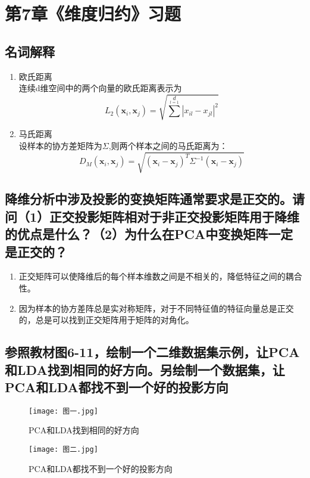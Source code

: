 \documentclass{ctexart}
\begin{document}
\section*{第7章《维度归约》习题}
\subsection*{名词解释}
\begin{enumerate}[(1)]
\item 欧氏距离\\
连续d维空间中的两个向量的欧氏距离表示为
\begin{equation*}
L_2(\bm{x}_i,\bm{x}_j)=\sqrt{\sum\limits^d\limits_{l=1}|x_{il}-x_{jl}|^2}
\end{equation*}
\item 马氏距离\\
设样本的协方差矩阵为$\Sigma$,则两个样本之间的马氏距离为：
\begin{equation*}
D_M(\bm{x}_i,\bm{x}_j)=\sqrt{(\bm{x}_i-\bm{x}_j)^T\Sigma^{-1}(\bm{x}_i-\bm{x}_j)}
\end{equation*}
\end{enumerate}


\subsection*{降维分析中涉及投影的变换矩阵通常要求是正交的。请问（1）正交投影矩阵相对于非正交投影矩阵用于降维的优点是什么？（2）为什么在PCA中变换矩阵一定是正交的？}
\begin{enumerate}[(1)]
\item 正交矩阵可以使降维后的每个样本维数之间是不相关的，降低特征之间的耦合性。
\item 因为样本的协方差阵总是实对称矩阵，对于不同特征值的特征向量总是正交的，总是可以找到正交矩阵用于矩阵的对角化。
\end{enumerate}

\subsection*{参照教材图6-11，绘制一个二维数据集示例，让PCA和LDA找到相同的好方向。另绘制一个数据集，让PCA和LDA都找不到一个好的投影方向}

\begin{figure}[H]
\texttt{[image: 图一.jpg]}
\caption{PCA和LDA找到相同的好方向}
\end{figure}

\begin{figure}[H]
\texttt{[image: 图二.jpg]}
\caption{PCA和LDA都找不到一个好的投影方向}
\end{figure}
\end{document}
